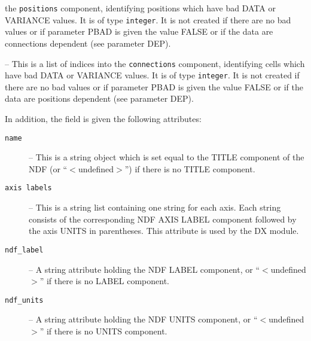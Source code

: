 {{\begin{description}
      the {\tt positions} component, identifying positions which have bad
      DATA or VARIANCE values. It is of type {\tt integer}. It is not
      created if there are no bad values or if parameter PBAD is given
      the value FALSE or if the data are connections dependent (see
      parameter DEP).
      \item [{\tt invalid connections}] -- This is a list of indices into
      the {\tt connections} component, identifying cells which have bad
      DATA or VARIANCE values. It is of type {\tt integer}. It is not
      created if there are no bad values or if parameter PBAD is given
      the value FALSE or if the data are positions dependent (see
      parameter DEP).
      \end{description}

      In addition, the field is given the following attributes:
      \begin{description}
      \item [{\tt name}] -- This is a string object which is set equal to
      the TITLE component of the NDF (or ``$<$undefined$>$'') if there is no TITLE
      component.
      \item [{\tt axis labels}] -- This is a string list containing one
      string for each axis. Each string consists of the corresponding NDF AXIS
      LABEL component followed by the axis UNITS in parentheses. This
      attribute is used by the DX  module.
      \item [{\tt ndf\_label}] -- A string attribute holding the NDF LABEL
      component, or ``$<$undefined$>$'' if there is no LABEL component.
      \item [{\tt ndf\_units}] -- A string attribute holding the NDF UNITS
      component, or ``$<$undefined$>$'' if there is no UNITS component.
      \end{description}


}}
